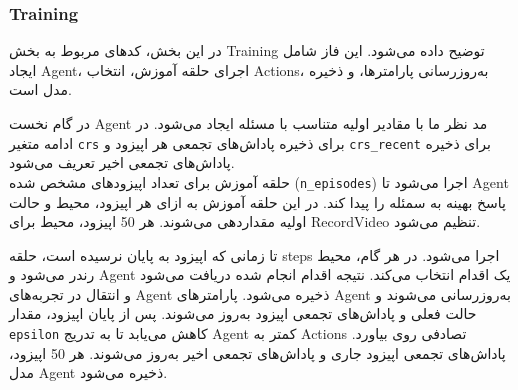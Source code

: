 \documentclass{article}
\begin{document}
\subsubsection{Training}

در این بخش، کدهای مربوط به بخش Training توضیح داده می‌شود. این فاز شامل ایجاد Agent، اجرای حلقه آموزش، انتخاب Actions، به‌روزرسانی پارامترها، و ذخیره مدل است.


در گام نخست Agent مد نظر ما با مقادیر اولیه متناسب با مسئله ایجاد می‌شود. در ادامه 
متغیر \texttt{crs} برای ذخیره پاداش‌های تجمعی هر اپیزود و \texttt{crs\_recent} برای ذخیره پاداش‌های تجمعی اخیر تعریف می‌شود.\\
حلقه آموزش برای تعداد اپیزودهای مشخص شده (\texttt{n\_episodes}) اجرا می‌شود تا Agent پاسخ بهینه به سمئله را پیدا کند.
در این حلقه آموزش به ازای هر اپیزود، محیط و حالت اولیه مقداردهی می‌شوند. هر 50 اپیزود، محیط برای  RecordVideo تنظیم می‌شود.

تا زمانی که اپیزود به پایان نرسیده است، حلقه steps اجرا می‌شود. در هر گام، محیط رندر می‌شود و Agent یک اقدام انتخاب می‌کند.
نتیجه اقدام انجام شده دریافت می‌شود و انتقال در تجربه‌های Agent ذخیره می‌شود.
پارامترهای Agent به‌روزرسانی می‌شوند و حالت فعلی و پاداش‌های تجمعی اپیزود به‌روز می‌شوند.
پس از پایان اپیزود، مقدار \texttt{epsilon} کاهش می‌یابد تا به تدریج Agent کمتر به Actions تصادفی روی بیاورد.
پاداش‌های تجمعی اپیزود جاری و پاداش‌های تجمعی اخیر به‌روز می‌شوند.
هر 50 اپیزود، مدل Agent ذخیره می‌شود.
\end{document}
